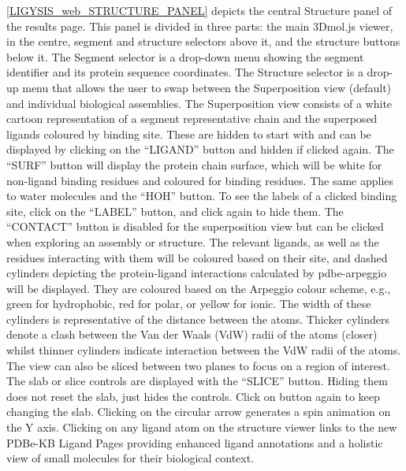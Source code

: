 \autoref{LIGYSIS_web_STRUCTURE_PANEL} depicts the central Structure panel of the results page. This panel is divided in three parts: the main 3Dmol.js viewer, in the centre, segment and structure selectors above it, and the structure buttons below it. The Segment selector  is a drop-down menu showing the segment identifier and its protein sequence coordinates. The Structure selector is a drop-up menu that allows the user to swap between the Superposition view (default) and individual biological assemblies. The Superposition view consists of a white cartoon representation of a segment representative chain and the superposed ligands coloured by binding site. These are hidden to start with and can be displayed by clicking on the ``LIGAND'' button and hidden if clicked again. The ``SURF'' button will display the protein chain surface, which will be white for non-ligand binding residues and coloured for binding residues. The same applies to water molecules and the ``HOH'' button. To see the labels of a clicked binding site, click on the ``LABEL'' button, and click again to hide them. The ``CONTACT'' button is disabled for the superposition view but can be clicked when exploring an assembly or structure. The relevant ligands, as well as the residues interacting with them will be coloured based on their site, and dashed cylinders depicting the protein-ligand interactions calculated by pdbe-arpeggio will be displayed. They are coloured based on the Arpeggio colour scheme, e.g., green for hydrophobic, red for polar, or yellow for ionic. The width of these cylinders is representative of the distance between the atoms. Thicker cylinders denote a clash between the Van der Waals (VdW) radii of the atoms (closer) whilst thinner cylinders indicate interaction between the VdW radii of the atoms. The view can also be sliced between two planes to focus on a region of interest. The slab or slice controls are displayed with the ``SLICE'' button. Hiding them does not reset the slab, just hides the controls. Click on button again to keep changing the slab. Clicking on the circular arrow generates a spin animation on the Y axis. Clicking on any ligand atom on the structure viewer links to the new PDBe-KB Ligand Pages \cite{CHOUDHARY_2024_PDBETOOLS} providing enhanced ligand annotations and a holistic view of small molecules for their biological context.

